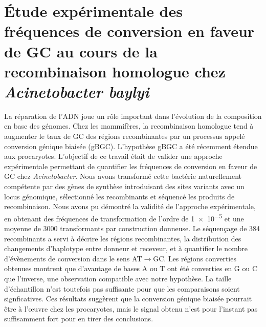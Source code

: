 \blankpage


\section*{\large Étude expérimentale des fréquences de conversion en faveur de GC au
  cours de la recombinaison homologue chez \emph{Acinetobacter baylyi}}

La réparation de l'ADN joue un rôle important dans l'évolution de la composition
en base des génomes. Chez les mammifères, la recombinaison homologue tend à
augmenter le taux de GC des régions recombinantes par un processus appelé
conversion génique biaisée (gBGC). L'hypothèse gBGC a été récemment étendue aux
procaryotes. L'objectif de ce travail était de valider une approche
expérimentale permettant de quantifier les fréquences de conversion en faveur de
GC chez \emph{Acinetobacter}. Nous avons transformé cette bactérie naturellement
compétente par des gènes de synthèse introduisant des sites variants avec un
locus génomique, sélectionné les recombinants et séquencé les produits de
recombinaison. Nous avons pu démontré la validité de l'approche expérimentale,
en obtenant des fréquences de transformation de l'ordre de \num{1e-5} et une
moyenne de \num{3000} transformants par construction donneuse. Le séquençage de
\num{384} recombinants a servi à décrire les régions recombinantes, la
distribution des changements d'haplotype entre donneur et receveur, et à
quantifier le nombre d'évènements de conversion dans le sens AT$\rightarrow$GC.
Les régions converties obtenues montrent que d'avantage de bases A ou T ont été
converties en G ou C que l'inverse, une observation compatible avec notre
hypothèse. La taille d'échantillon n'est toutefois pas suffisante pour que les
comparaisons soient signficatives. Ces résultats suggèrent que la conversion
génique biaisée pourrait être à l'œuvre chez les procaryotes, mais le signal
obtenu n'est pour l'instant pas suffisamment fort pour en tirer des conclusions.
